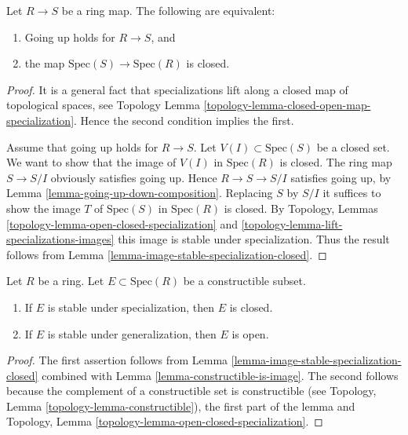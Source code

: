 \begin{lemma}
\label{lemma-going-up-closed}
Let $R \to S$ be a ring map. The following are equivalent:
\begin{enumerate}
\item Going up holds for $R \to S$, and
\item the map $\text{Spec}(S) \to \text{Spec}(R)$ is closed.
\end{enumerate}
\end{lemma}

\begin{proof}
It is a general fact that specializations lift along a
closed map of topological spaces, see Topology 
Lemma \ref{topology-lemma-closed-open-map-specialization}.
Hence the second condition implies the first.

\medskip\noindent
Assume that going up holds for $R \to S$.
Let $V(I) \subset \text{Spec}(S)$ be a closed set.
We want to show that the image of $V(I)$ in $\text{Spec}(R)$ is closed.
The ring map $S \to S/I$ obviously satisfies going up.
Hence $R \to S \to S/I$ satisfies going up,
by Lemma \ref{lemma-going-up-down-composition}.
Replacing $S$ by $S/I$ it suffices to show the image $T$
of $\text{Spec}(S)$ in $\text{Spec}(R)$ is closed.
By Topology, Lemmas \ref{topology-lemma-open-closed-specialization}
and \ref{topology-lemma-lift-specializations-images} this 
image is stable under specialization. Thus the result follows
from Lemma \ref{lemma-image-stable-specialization-closed}.
\end{proof}

\begin{lemma}
\label{lemma-constructible-stable-specialization-closed}
Let $R$ be a ring. Let $E \subset \text{Spec}(R)$ be a constructible subset.
\begin{enumerate}
\item If $E$ is stable under specialization, then $E$ is closed.
\item If $E$ is stable under generalization, then $E$ is open.
\end{enumerate}
\end{lemma}

\begin{proof}
The first assertion
follows from Lemma \ref{lemma-image-stable-specialization-closed}
combined with Lemma \ref{lemma-constructible-is-image}.
The second follows because the complement of a constructible
set is constructible
(see Topology, Lemma \ref{topology-lemma-constructible}),
the first part of the lemma and Topology,
Lemma \ref{topology-lemma-open-closed-specialization}.
\end{proof}

